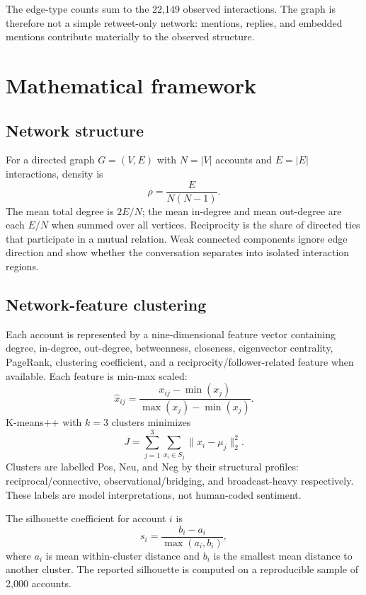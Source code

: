 \documentclass[11pt]{article}
\begin{document}
The edge-type counts sum to the 22,149 observed interactions. The graph is therefore not a simple retweet-only network: mentions, replies, and embedded mentions contribute materially to the observed structure.

\section{Mathematical framework}

\subsection{Network structure}
For a directed graph $G=(V,E)$ with $N=|V|$ accounts and $E=|E|$ interactions, density is
\begin{equation}
\rho=\frac{E}{N(N-1)}.
\end{equation}
The mean total degree is $2E/N$; the mean in-degree and mean out-degree are each $E/N$ when summed over all vertices. Reciprocity is the share of directed ties that participate in a mutual relation. Weak connected components ignore edge direction and show whether the conversation separates into isolated interaction regions.

\subsection{Network-feature clustering}
Each account is represented by a nine-dimensional feature vector containing degree, in-degree, out-degree, betweenness, closeness, eigenvector centrality, PageRank, clustering coefficient, and a reciprocity/follower-related feature when available. Each feature is min-max scaled:
\begin{equation}
\hat{x}_{ij}=\frac{x_{ij}-\min(x_j)}{\max(x_j)-\min(x_j)}.
\end{equation}
K-means++ with $k=3$ clusters minimizes
\begin{equation}
J=\sum_{j=1}^{3}\sum_{x_i\in S_j}\lVert x_i-\mu_j\rVert_2^2.
\end{equation}
Clusters are labelled Pos, Neu, and Neg by their structural profiles: reciprocal/connective, observational/bridging, and broadcast-heavy respectively. These labels are model interpretations, not human-coded sentiment.

The silhouette coefficient for account $i$ is
\begin{equation}
s_i=\frac{b_i-a_i}{\max(a_i,b_i)},
\end{equation}
where $a_i$ is mean within-cluster distance and $b_i$ is the smallest mean distance to another cluster. The reported silhouette is computed on a reproducible sample of 2,000 accounts.
\end{document}
